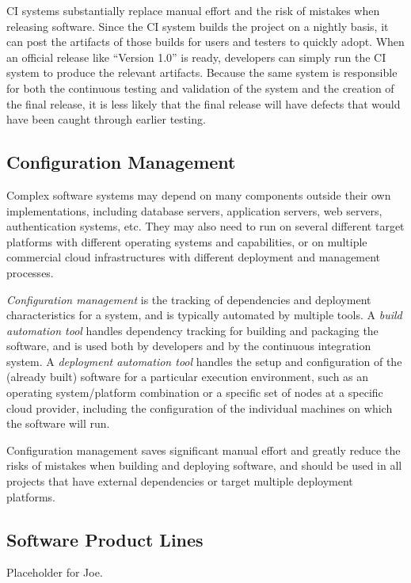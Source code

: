 CI systems substantially replace manual effort and the risk of
mistakes when releasing software. Since the CI system builds the
project on a nightly basis, it can post the artifacts of those builds
for users and testers to quickly adopt. When an official release like
``Version 1.0'' is ready, developers can simply run the CI system to
produce the relevant artifacts. Because the same system is responsible
for both the continuous testing and validation of the system and the
creation of the final release, it is less likely that the final
release will have defects that would have been caught through earlier
testing.

\subsection{Configuration Management}

Complex software systems may depend on many components outside their
own implementations, including database servers, application servers,
web servers, authentication systems, etc. They may also need to run on
several different target platforms with different operating systems
and capabilities, or on multiple commercial cloud infrastructures with
different deployment and management processes.

\emph{Configuration management} is the tracking of dependencies and
deployment characteristics for a system, and is typically automated by
multiple tools. A \emph{build automation tool} handles dependency
tracking for building and packaging the software, and is used both by
developers and by the continuous integration system. A
\emph{deployment automation tool} handles the setup and configuration
of the (already built) software for a particular execution
environment, such as an operating system/platform combination or a
specific set of nodes at a specific cloud provider, including the
configuration of the individual machines on which the software will
run.

Configuration management saves significant manual effort and greatly
reduce the risks of mistakes when building and deploying software, and
should be used in all projects that have external dependencies or
target multiple deployment platforms.

\subsection{Software Product Lines}

Placeholder for Joe. 

